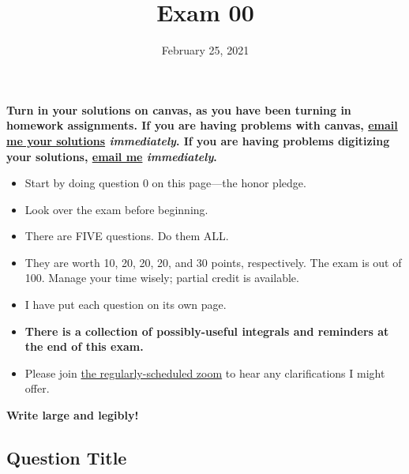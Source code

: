 
\providecommand{\repositoryInformationSetup}{} %
\repositoryInformationSetup


\pointsinleftmargin 
{}
\extrawidth{-0.5in}


\title{Exam 00}
\contact
\date{February 25, 2021}

\maketitle

{\bf Turn in your solutions on canvas, as you have been turning in homework assignments.  If you are having problems with canvas, \href{mailto:\myEmail}{email me your solutions} \emph{immediately}.  If you are having problems digitizing your solutions, \href{mailto:\myEmail}{email me} \emph{immediately}.}

\begin{itemize}
	\item	Start by doing question 0 on this page---the honor pledge.
	\item	Look over the exam before beginning.
	\item	There are FIVE questions.  Do them ALL.
	\item	They are worth 10, 20, 20, 20, and 30 points, respectively.  The exam is out of 100.  Manage your time wisely; partial credit is available.
	\item	I have put each question on its own page.  
	\item	{\bf There is a collection of possibly-useful integrals and reminders at the end of this exam.}
	\item	Please join \href{}{the regularly-scheduled zoom} to hear any clarifications I might offer.
\end{itemize}

{\bf Write large and legibly!}


\begin{questions}
	\clearpage
	\section*{Question Title}
	
\end{questions}

\ifprintanswers
\else
	\clearpage
	
\fi

